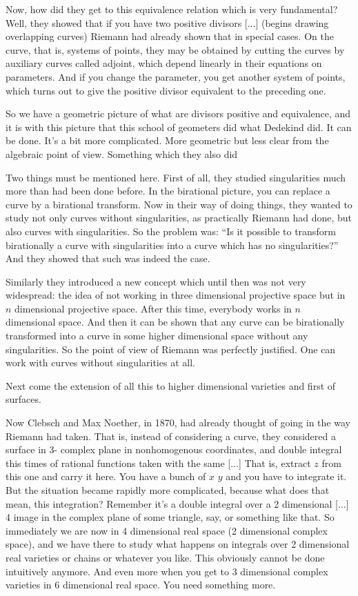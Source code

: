 \documentclass{article}
\begin{document}
Now, how did they get to this equivalence relation 
which is very fundamental?
Well, they showed that if you have two positive divisors [...]
(begins drawing overlapping curves)
Riemann had already shown that in special cases.
On the curve, that is, systems of points,
they may be obtained by cutting the curves 
by auxiliary curves called adjoint,  
which depend linearly in their equations on parameters.
And if you change the parameter, you get another system of points,
which turns out to give the positive divisor 
equivalent to the preceding one.

So we have a geometric picture 
of what are divisors positive and equivalence, 
and it is with this picture that this school of geometers
did what Dedekind did.
It can be done.
It's a bit more complicated.
More geometric but less clear from the algebraic point of view.
Something which they also did

Two things must be mentioned here.
First of all, they studied singularities 
much more than had been done before.
In the birational picture,
you can replace a curve by a birational transform.
Now in their way of doing things,
they wanted to study not only curves without singularities,
as practically Riemann had done,
but also curves with singularities.
So the problem was:
``Is it possible to transform birationally a curve with singularities 
into a curve which has no singularities?''
And they showed that such was indeed the case.

Similarly they introduced a new concept
which until then was not very widespread:
the idea of not working in three dimensional projective space
but in $n$ dimensional projective space.
After this time, everybody works in $n$ dimensional space.
And then it can be shown that any curve 
can be birationally transformed
into a curve in some higher dimensional space
without any singularities.
So the point of view of Riemann was perfectly justified.
One can work with curves without singularities at all.

Next come the extension of all this 
to higher dimensional varieties
and first of surfaces.

Now Clebsch and Max Noether, in 1870,
had already thought of going in the way Riemann had taken. 
That is, instead of considering a curve, 
they considered a surface in 3- complex plane 
in nonhomogenous coordinates,
and double integral this times of rational functions
taken with the same [...]
That is, extract $z$ from this one and carry it here.
You have a bunch of $x$ $y$ and you have to integrate it.
But the situation became rapidly more complicated,
because what does that mean, this integration?
Remember it's a double integral over a 2 dimensional [...] 4
image in the complex plane of some triangle, say, or something like that.
So immediately we are now in 4 dimensional real space 
(2 dimensional complex space),
and we have there to study what happens 
on integrals over 2 dimensional real varieties
or chains or whatever you like.
This obviously cannot be done intuitively anymore.
And even more when you get to 3 dimensional complex varieties
in 6 dimensional real space.
You need something more.
\end{document}
